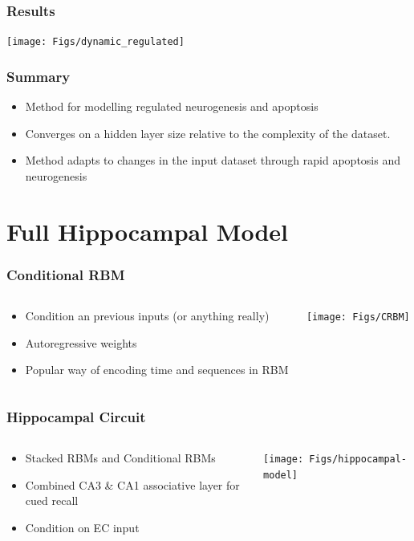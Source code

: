 \documentclass{beamer}
\begin{document}
\begin{frame}
\frametitle{Results}
\center
\texttt{[image: Figs/dynamic\_regulated]}
\end{frame}

\begin{frame}
\frametitle{Summary}
\begin{itemize}
\item Method for modelling regulated neurogenesis and apoptosis
\item Converges on a hidden layer size relative to the complexity of the dataset.
\item Method adapts to changes in the input dataset through rapid apoptosis and neurogenesis
\end{itemize}
\end{frame}

\section{Full Hippocampal Model}

\begin{frame}
\frametitle{Conditional RBM}
\begin{columns}[T]
\begin{column}[T]{.49\linewidth}
\begin{itemize}
\item Condition an previous inputs (or anything really)
\item Autoregressive weights
\item Popular way of encoding time and sequences in RBM
\end{itemize}
\end{column}
\begin{column}[T]{.49\linewidth}
\texttt{[image: Figs/CRBM]}
\end{column}
\end{columns}
\end{frame}

\begin{frame}
\frametitle{Hippocampal Circuit}
\begin{columns}[T]
\begin{column}[T]{.49\linewidth}
\begin{itemize}
\item Stacked RBMs and Conditional RBMs
\item Combined CA3 \& CA1 associative layer for cued recall
\item Condition on EC input
\end{itemize}
\end{column}
\begin{column}[T]{.49\linewidth}
\texttt{[image: Figs/hippocampal-model]}
\end{column}
\end{columns}
\end{frame}
\end{document}
